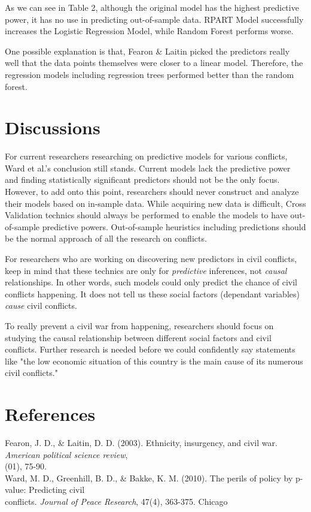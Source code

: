 \documentclass{article}
\begin{document}
As we can see in Table 2, although the original model has the highest predictive power, it has no use in predicting out-of-sample data. RPART Model successfully increases the Logistic Regression Model, while Random Forest performs worse.

One possible explanation is that, Fearon \& Laitin picked the predictors really well that the data points themselves were closer to a linear model. Therefore, the regression models including regression trees performed better than the random forest.  
\section{Discussions}
For current researchers researching on predictive models for various conflicts, Ward et al.'s conclusion still stands. Current models lack the predictive power and finding statistically significant predictors should not be the only focus. However, to add onto this point, researchers should never construct and analyze their models based on in-sample data. While acquiring new data is difficult, Cross Validation technics should always be performed to enable the models to have out-of-sample predictive powers. Out-of-sample heuristics including predictions should be the normal approach of all the research on conflicts.

For researchers who are working on discovering new predictors in civil conflicts, keep in mind that these technics are only for \textit{predictive} inferences, not \textit{causal} relationships. In other words, such models could only predict the chance of civil conflicts happening. It does not tell us these social factors (dependant variables) \textit{cause} civil conflicts. 

To really prevent a civil war from happening, researchers should focus on studying the causal relationship between different social factors and civil conflicts. Further research is needed before we could confidently say statements like "the low economic situation of this country is the main cause of its numerous civil conflicts."

\section{References}
Fearon, J. D., \& Laitin, D. D. (2003). Ethnicity, insurgency, and civil war. \textit{American political science review},\\ (01), 75-90. \\
Ward, M. D., Greenhill, B. D., \& Bakke, K. M. (2010). The perils of policy by p-value: Predicting civil\\ \indent conflicts. \textit{Journal of Peace Research}, 47(4), 363-375. Chicago	
\end{document}
